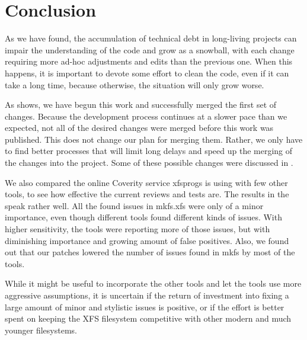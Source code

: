 
\chapter{Conclusion} \label{chap:conclusion}

As we have found, the accumulation of technical debt in long-living
projects can impair the understanding of the code and grow as a
snowball, with each change requiring more ad-hoc adjustments and edits than
the previous one. When this happens, it is important to devote some effort
to clean the code, even if it can take a long time, because otherwise, the
situation will only grow worse.

As  shows, we have begun this work and successfully
merged the first set of changes. Because the development process continues
at a slower pace than we expected, not all of the desired changes were
merged before this work was published. This does not change our plan for
merging them. Rather, we only have to find better processes that will limit
long delays and speed up the merging of the changes into the project. Some
of these possible changes were discussed in
.

We also compared the online Coverity service xfsprogs is using with few
other tools, to see how effective the current reviews and tests are. The
results in the  speak rather well. All the found issues
in mkfs.xfs were only of a minor importance, even though different tools
found different kinds of issues. With higher sensitivity, the tools were
reporting more of those issues, but with diminishing importance and growing
amount of false positives. Also, we found out that our patches lowered the
number of issues found in mkfs by most of the tools.

While it might be useful to incorporate the other tools and let the tools
use more aggressive assumptions, it is uncertain if the return of
investment into fixing a large amount of minor and stylistic issues is
positive, or if the effort is better spent on keeping the XFS filesystem
competitive with other modern and much younger filesystems.
